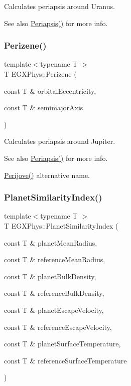 Calculates periapsis around Uranus. 

\begin{DoxySeeAlso}{See also}
\hyperlink{group___astrophysics_ga4414ac75539371ec874a3d25cad6c9fe}{Periapsis()} for more info. 
\end{DoxySeeAlso}
\mbox{\label{group___astrophysics_ga0523c65b7fc26e675388b2c3d38aa00b}} 
\subsubsection{\texorpdfstring{Perizene()}{Perizene()}}
{\footnotesize\ttfamily template$<$typename T $>$ \\
T E\+G\+X\+Phys\+::\+Perizene (\begin{DoxyParamCaption}\item[{const T \&}]{orbital\+Eccentricity,  }\item[{const T \&}]{semimajor\+Axis }\end{DoxyParamCaption})}



Calculates periapsis around Jupiter. 

\begin{DoxySeeAlso}{See also}
\hyperlink{group___astrophysics_ga4414ac75539371ec874a3d25cad6c9fe}{Periapsis()} for more info. 

\hyperlink{group___astrophysics_ga075052f7ff9aa1d5fdf4501b493be86b}{Perijove()} alternative name. 
\end{DoxySeeAlso}
\mbox{\label{group___astrophysics_ga62e8b781c301df60bd04af3183a965eb}} 
\subsubsection{\texorpdfstring{Planet\+Similarity\+Index()}{PlanetSimilarityIndex()}}
{\footnotesize\ttfamily template$<$typename T $>$ \\
T E\+G\+X\+Phys\+::\+Planet\+Similarity\+Index (\begin{DoxyParamCaption}\item[{const T \&}]{planet\+Mean\+Radius,  }\item[{const T \&}]{reference\+Mean\+Radius,  }\item[{const T \&}]{planet\+Bulk\+Density,  }\item[{const T \&}]{reference\+Bulk\+Density,  }\item[{const T \&}]{planet\+Escape\+Velocity,  }\item[{const T \&}]{reference\+Escape\+Velocity,  }\item[{const T \&}]{planet\+Surface\+Temperature,  }\item[{const T \&}]{reference\+Surface\+Temperature }\end{DoxyParamCaption})}



